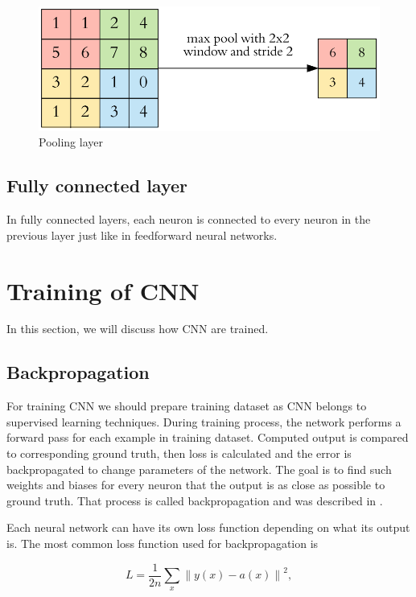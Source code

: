 \documentclass[twoside]{ctuthesis}
\theoremstyle{plain}
\theoremstyle{definition}
\theoremstyle{note}
\newcommand{\norm}[1]{\left\lVert#1\right\rVert}
\begin{document}
\begin{figure}[h]
\caption{Pooling layer\cite{cs231n}}
\label{pooling}
\includegraphics[width=\textwidth]{images/neural_networks/pooling.png}
\end{figure}

\subsection{Fully connected layer}

In fully connected layers, each neuron is connected to every neuron in the previous layer just like in feedforward neural networks.

\section{Training of CNN}

In this section, we will discuss how CNN are trained.

\subsection{Backpropagation}

For training CNN we should prepare training dataset as CNN belongs to supervised learning techniques. During training process, the network performs a forward pass for each example in training dataset. Computed output is compared to corresponding ground truth,  then loss is calculated and the error is backpropagated to change parameters of the network. The goal is to find such weights and biases for every neuron that the output is as close as possible to ground truth. That process is called backpropagation and was described in \cite{rumelhart_hinton_williams_1986}.

Each neural network can have its own loss function depending on what its output is. The most common loss function used for backpropagation is 

\begin{equation}
L = \frac{1}{2n}\sum_x\norm{y(x) - a(x)}^2	, 
\end{equation}
\end{document}
